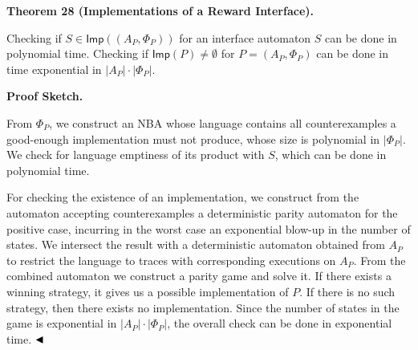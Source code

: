  
 
\par\medskip\noindent\textbf{Theorem 28 (Implementations of a Reward Interface).}\par
 
 
Checking if $S\in\mathsf{Imp}((A_{P},\Phi_{P}))$ for an interface automaton $S$ can be done in polynomial time. Checking if $\mathsf{Imp}(P)\neq\emptyset$ for $P=(A_{P},\Phi_{P})$ can be done in time exponential in $|A_{P}|\cdot|\Phi_{P}|$.\par
 
 
 
 
 
\par\medskip\noindent\textbf{Proof Sketch.}\par
 
 
From $\Phi_{P}$, we construct an NBA whose language contains all counterexamples a good-enough implementation must not produce, whose size is polynomial in $|\Phi_{P}|$. We check for language emptiness of its product with $S$, which can be done in polynomial time.\par
 
 
 
For checking the existence of an implementation, we construct from the automaton accepting counterexamples a deterministic parity automaton for the positive case, incurring in the worst case an exponential blow-up in the number of states. We intersect the result with a deterministic automaton obtained from $A_{P}$ to restrict the language to traces with corresponding executions on $A_{P}$. From the combined automaton we construct a parity game and solve it. If there exists a winning strategy, it gives us a possible implementation of $P$. If there is no such strategy, then there exists no implementation. Since the number of states in the game is exponential in $|A_{P}|\cdot|\Phi_{P}|$, the overall check can be done in exponential time. $\hfill\blacktriangleleft$\par
 
 
